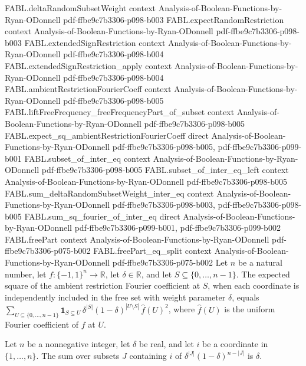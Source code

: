 \begin{theorem}
\proofstep
  {FABL.deltaRandomSubsetWeight}
  {context}
  {Analysis-of-Boolean-Functions-by-Ryan-ODonnell}
  {pdf-ffbe9c7b3306-p098-b003}
\proofstep
  {FABL.expectRandomRestriction}
  {context}
  {Analysis-of-Boolean-Functions-by-Ryan-ODonnell}
  {pdf-ffbe9c7b3306-p098-b003}
\proofstep
  {FABL.extendedSignRestriction}
  {context}
  {Analysis-of-Boolean-Functions-by-Ryan-ODonnell}
  {pdf-ffbe9c7b3306-p098-b004}
\proofstep
  {FABL.extendedSignRestriction_apply}
  {context}
  {Analysis-of-Boolean-Functions-by-Ryan-ODonnell}
  {pdf-ffbe9c7b3306-p098-b004}
\proofstep
  {FABL.ambientRestrictionFourierCoeff}
  {context}
  {Analysis-of-Boolean-Functions-by-Ryan-ODonnell}
  {pdf-ffbe9c7b3306-p098-b005}
\proofstep
  {FABL.liftFreeFrequency_freeFrequencyPart_of_subset}
  {context}
  {Analysis-of-Boolean-Functions-by-Ryan-ODonnell}
  {pdf-ffbe9c7b3306-p098-b005}
\proofstep
  {FABL.expect_sq_ambientRestrictionFourierCoeff}
  {direct}
  {Analysis-of-Boolean-Functions-by-Ryan-ODonnell}
  {pdf-ffbe9c7b3306-p098-b005,
    pdf-ffbe9c7b3306-p099-b001}
\proofstep
  {FABL.subset_of_inter_eq}
  {context}
  {Analysis-of-Boolean-Functions-by-Ryan-ODonnell}
  {pdf-ffbe9c7b3306-p098-b005}
\proofstep
  {FABL.subset_of_inter_eq_left}
  {context}
  {Analysis-of-Boolean-Functions-by-Ryan-ODonnell}
  {pdf-ffbe9c7b3306-p098-b005}
\proofstep
  {FABL.sum_deltaRandomSubsetWeight_inter_eq}
  {context}
  {Analysis-of-Boolean-Functions-by-Ryan-ODonnell}
  {pdf-ffbe9c7b3306-p098-b003,
    pdf-ffbe9c7b3306-p098-b005}
\proofstep
  {FABL.sum_sq_fourier_of_inter_eq}
  {direct}
  {Analysis-of-Boolean-Functions-by-Ryan-ODonnell}
  {pdf-ffbe9c7b3306-p099-b001,
    pdf-ffbe9c7b3306-p099-b002}
\proofstep
  {FABL.freePart}
  {context}
  {Analysis-of-Boolean-Functions-by-Ryan-ODonnell}
  {pdf-ffbe9c7b3306-p075-b002}
\proofstep
  {FABL.freePart_eq_split}
  {context}
  {Analysis-of-Boolean-Functions-by-Ryan-ODonnell}
  {pdf-ffbe9c7b3306-p075-b002}
Let $n$ be a natural number, let $f:\{-1,1\}^n\to\mathbb R$, let $\delta\in\mathbb R$,
and let $S\subseteq\{0,\ldots,n-1\}$. The expected square of the ambient restriction
Fourier coefficient at $S$, when each coordinate is independently included in the free
set with weight parameter $\delta$, equals
$\displaystyle\sum_{U\subseteq\{0,\ldots,n-1\}}\mathbf 1_{S\subseteq
U}\,\delta^{|S|}(1-\delta)^{|U\setminus S|}\,\widehat f(U)^2$, where $\widehat f(U)$ is
the uniform Fourier coefficient of $f$ at $U$.
\end{theorem}

\begin{theorem}
\label{FABL.sum_deltaRandomSubsetWeight_mem}
\leanok
{}
Let $n$ be a nonnegative integer, let $\delta$ be real, and let $i$ be a coordinate in
$\{1,\ldots,n\}$. The sum over subsets $J$ containing $i$ of
$\delta^{|J|}(1-\delta)^{n-|J|}$ is $\delta$.
\end{theorem}

